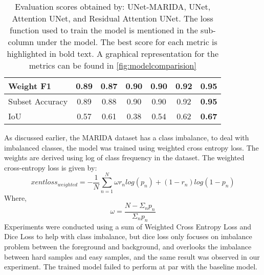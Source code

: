 \documentclass[review]{elsarticle}
\begin{document}
\begin{table}[]
{\begin{tabular}{|l|c|ccc|c|c|}
Weight F1 & 0.89 & \multicolumn{1}{c|}{0.87} & \multicolumn{1}{c|}{0.90} & 0.90 & 0.92 & \textbf{0.95} \\ \hline
Subset Accuracy & 0.89 & \multicolumn{1}{c|}{0.88} & \multicolumn{1}{c|}{0.90} & 0.90 & 0.92 & \textbf{0.95} \\ \hline
IoU & 0.57 & \multicolumn{1}{c|}{0.61} & \multicolumn{1}{c|}{0.38} & 0.54 & 0.62 & \textbf{0.67} \\ \hline
\end{tabular}}
\caption{Evaluation scores obtained by: UNet-MARIDA, UNet, Attention UNet, and Residual Attention UNet. The loss function used to train the model is mentioned in the sub-column under the model. The best score for each metric is highlighted in bold text. A graphical representation for the metrics can be found in \autoref{fig:modelcomparision}}
\label{tab:evaluation-table}
\end{table}

As discussed earlier, the MARIDA dataset has a class imbalance, to deal with imbalanced classes, the model was trained using weighted cross entropy loss. The weights are derived using log of class frequency in the dataset. The weighted cross-entropy loss is given by:
\[xentloss_{weighted} = -\frac{1}{N}\sum_{n=1}^{N}\omega r_n log(p_n) + (1-r_n)log(1-p_n)\]
Where, 
\[\omega=\frac{N-\Sigma_n p_n}{\Sigma_n p_n}\]
Experiments were conducted using a sum of Weighted Cross Entropy Loss and Dice Loss to help with class imbalance, but dice loss only focuses on imbalance problem between the foreground and background, and overlooks the imbalance between hard samples and easy samples\cite{9338261}, and the same result was observed in our experiment. The trained model failed to perform at par with the baseline model.
\end{document}
